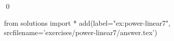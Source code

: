 
\begin{ex} 
  \label{ex:power-linear7}
  
  \qed
\end{ex} 
\begin{python0}
from solutions import *
add(label="ex:power-linear7",
    srcfilename='exercises/power-linear7/answer.tex') 
\end{python0}
